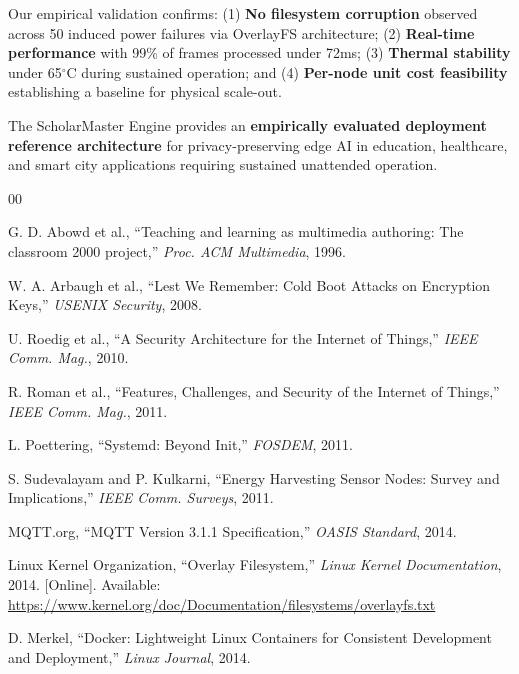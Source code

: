 \documentclass[conference]{IEEEtran}
\begin{document}
Our empirical validation confirms: (1) \textbf{No filesystem corruption} observed across 50 induced power failures via OverlayFS architecture; (2) \textbf{Real-time performance} with 99\% of frames processed under 72ms; (3) \textbf{Thermal stability} under 65$^{\circ}$C during sustained operation; and (4) \textbf{Per-node unit cost feasibility} establishing a baseline for physical scale-out.

The ScholarMaster Engine provides an \textbf{empirically evaluated deployment reference architecture} for privacy-preserving edge AI in education, healthcare, and smart city applications requiring sustained unattended operation.

\begin{thebibliography}{00}

 G. D. Abowd et al., ``Teaching and learning as multimedia authoring: The classroom 2000 project,'' \textit{Proc. ACM Multimedia}, 1996.

 W. A. Arbaugh et al., ``Lest We Remember: Cold Boot Attacks on Encryption Keys,'' \textit{USENIX Security}, 2008.

 U. Roedig et al., ``A Security Architecture for the Internet of Things,'' \textit{IEEE Comm. Mag.}, 2010.

 R. Roman et al., ``Features, Challenges, and Security of the Internet of Things,'' \textit{IEEE Comm. Mag.}, 2011.

 L. Poettering, ``Systemd: Beyond Init,'' \textit{FOSDEM}, 2011.

 S. Sudevalayam and P. Kulkarni, ``Energy Harvesting Sensor Nodes: Survey and Implications,'' \textit{IEEE Comm. Surveys}, 2011.


 MQTT.org, ``MQTT Version 3.1.1 Specification,'' \textit{OASIS Standard}, 2014.

 Linux Kernel Organization, ``Overlay Filesystem,'' \textit{Linux Kernel Documentation}, 2014. [Online]. Available: \url{https://www.kernel.org/doc/Documentation/filesystems/overlayfs.txt}


 D. Merkel, ``Docker: Lightweight Linux Containers for Consistent Development and Deployment,'' \textit{Linux Journal}, 2014.


\end{thebibliography}
\end{document}
